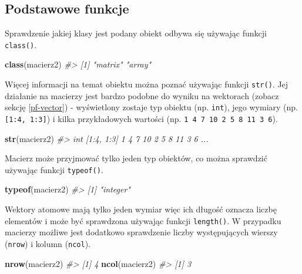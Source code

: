 \documentclass[paper=6in:9in,pagesize=pdftex,headinclude=on,footinclude=on,10pt]{scrbook}
\newenvironment{Shaded}{\begin{snugshade}}{\end{snugshade}}
\newcommand{\CommentTok}[1]{\textcolor[rgb]{0.56,0.35,0.01}{\textit{#1}}}
\newcommand{\KeywordTok}[1]{\textcolor[rgb]{0.13,0.29,0.53}{\textbf{#1}}}
\newcommand{\NormalTok}[1]{#1}
\begin{document}
\hypertarget{podstawowe-funkcje}{%
\subsection{Podstawowe funkcje}\label{podstawowe-funkcje}}

Sprawdzenie jakiej klasy jest podany obiekt odbywa się używając funkcji \texttt{class()}.

\begin{Shaded}
\begin{Highlighting}[]
\KeywordTok{class}\NormalTok{(macierz2)}
\CommentTok{#> [1] "matrix" "array"}
\end{Highlighting}
\end{Shaded}

Więcej informacji na temat obiektu można poznać używając funkcji \texttt{str()}.
Jej działanie na macierzy jest bardzo podobne do wyniku na wektorach (zobacz sekcję \ref{pf-vector}) - wyświetlony zostaje typ obiektu (np. \texttt{int}), jego wymiary (np. \texttt{{[}1:4,\ 1:3{]}}) i kilka przykładowych wartości (np. \texttt{1\ 4\ 7\ 10\ 2\ 5\ 8\ 11\ 3\ 6}).

\begin{Shaded}
\begin{Highlighting}[]
\KeywordTok{str}\NormalTok{(macierz2)}
\CommentTok{#>  int [1:4, 1:3] 1 4 7 10 2 5 8 11 3 6 ...}
\end{Highlighting}
\end{Shaded}

Macierz może przyjmować tylko jeden typ obiektów, co można sprawdzić używając funkcji \texttt{typeof()}.

\begin{Shaded}
\begin{Highlighting}[]
\KeywordTok{typeof}\NormalTok{(macierz2)}
\CommentTok{#> [1] "integer"}
\end{Highlighting}
\end{Shaded}

Wektory atomowe mają tylko jeden wymiar więc ich długość oznacza liczbę elementów i może być sprawdzona używając funkcji \texttt{length()}.
W przypadku macierzy możliwe jest dodatkowo sprawdzenie liczby występujących wierszy (\texttt{nrow}) i kolumn (\texttt{ncol}).

\begin{Shaded}
\begin{Highlighting}[]
\KeywordTok{nrow}\NormalTok{(macierz2)}
\CommentTok{#> [1] 4}
\KeywordTok{ncol}\NormalTok{(macierz2)}
\CommentTok{#> [1] 3}
\end{Highlighting}
\end{Shaded}
\end{document}

